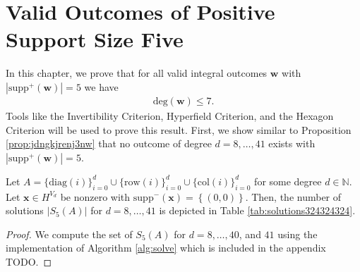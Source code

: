 \chapter{Valid Outcomes of Positive Support
Size Five}

In this chapter, we prove that for all valid integral outcomes \( \mathbf w \) with \( |\mathrm{supp}^+(\mathbf w)| = 5 \) we have
\begin{align*}
    \mathrm{deg}(\mathbf w) \leq 7.
\end{align*}
Tools like the Invertibility Criterion, Hyperfield Criterion, and the Hexagon Criterion will be used to prove this result.
First, we show similar to Proposition \ref{prop:jdngkjrenj3nw} that no outcome of degree \( d = 8, \dots, 41 \) exists with \( |\mathrm{supp}^+(\mathbf w)| = 5 \).

\begin{proposition}
    Let $A = \{ \mathrm{diag}(i) \}_{i=0}^d \cup \{ \mathrm{row}(i)\}^d_{i=0} \cup \{ \mathrm{col}(i) \}^d_{i=0}$ for some degree \( d \in \mathbb{N} \). Let \( \mathbf{x} \in H^{V_d} \) be nonzero with \( \mathrm{supp}^-(\mathbf{x}) = \left\{ (0,0) \right\} \). Then, the number of solutions \( \lvert S_5(A) \rvert \) for \( d = 8, \dots, 41 \) is depicted in Table \ref{tab:solutions324324324}.
\end{proposition}

\begin{proof}
    We compute the set of \( S_5(A) \) for \( d = 8, \dots, 40 \), and \( 41 \) using the implementation of Algorithm \ref{alg:solve} which is included in the appendix TODO.
\end{proof}

